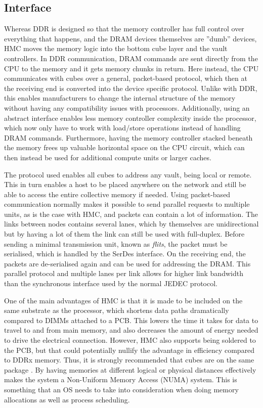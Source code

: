 \subsection{Interface}
Whereas DDR is designed so that the memory controller has full control over everything that happens, and the DRAM devices themselves are ''dumb'' devices, HMC moves the memory logic into the bottom cube layer and the vault controllers. In DDR communication, DRAM commands are sent directly from the CPU to the memory and it gets memory chunks in return. Here instead, the CPU communicates with cubes over a general, packet-based protocol, which then at the receiving end is converted into the device specific protocol. Unlike with DDR, this enables manufacturers to change the internal structure of the memory without having any compatibility issues with processors. Additionally, using an abstract interface enables less memory controller complexity inside the processor, which now only have to work with load/store operations instead of handling DRAM commands. Furthermore, having the memory controller stacked beneath the memory frees up valuable horizontal space on the CPU circuit, which can then instead be used for additional compute units or larger caches.  
\bigskip

The protocol used enables all cubes to address any vault, being local or remote. This in turn enables a host to be placed anywhere on the network and still be able to access the entire collective memory if needed. Using packet-based communication normally makes it possible to send parallel requests to multiple units, as is the case with HMC, and packets can contain a lot of information. The links between nodes contains several lanes, which by themselves are unidirectional but by having a lot of them the link can still be used with full-duplex. Before sending a minimal transmission unit, known as \emph{flits}, the packet must be serialised, which is handled by the SerDes interface. On the receiving end, the packets are de-serialised again and can be used for addressing the DRAM. This parallel protocol and multiple lanes per link allows for higher link bandwidth than the synchronous interface used by the normal JEDEC protocol. 
\bigskip

One of the main advantages of HMC is that it is made to be included on the same substrate as the processor, which shortens data paths dramatically compared to DIMMs attached to a PCB. This lowers the time it takes for data to travel to and from main memory, and also decreases the amount of energy needed to drive the electrical connection. However, HMC also supports being soldered to the PCB, but that could potentially nullify the advantage in efficiency compared to DDRx memory. Thus, it is strongly recommended that cubes are on the same package \cite{hybrid2013hybrid}. By having memories at different logical or physical distances effectively makes the system a Non-Uniform Memory Access (NUMA) system. This is something that an OS needs to take into consideration when doing memory allocations as well as process scheduling. 
\bigskip


